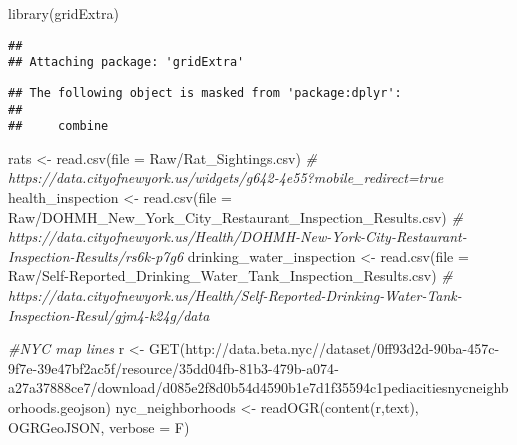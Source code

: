 \documentclass[
]{article}
\newenvironment{Shaded}{\begin{snugshade}}{\end{snugshade}}
\newcommand{\AttributeTok}[1]{\textcolor[rgb]{0.77,0.63,0.00}{#1}}
\newcommand{\CommentTok}[1]{\textcolor[rgb]{0.56,0.35,0.01}{\textit{#1}}}
\newcommand{\FunctionTok}[1]{\textcolor[rgb]{0.00,0.00,0.00}{#1}}
\newcommand{\NormalTok}[1]{#1}
\newcommand{\OtherTok}[1]{\textcolor[rgb]{0.56,0.35,0.01}{#1}}
\newcommand{\StringTok}[1]{\textcolor[rgb]{0.31,0.60,0.02}{#1}}
\begin{document}
\begin{Shaded}
\begin{Highlighting}[]
\FunctionTok{library}\NormalTok{(gridExtra)}
\end{Highlighting}
\end{Shaded}

\begin{verbatim}
## 
## Attaching package: 'gridExtra'
\end{verbatim}

\begin{verbatim}
## The following object is masked from 'package:dplyr':
## 
##     combine
\end{verbatim}

\begin{Shaded}
\begin{Highlighting}[]
\NormalTok{rats }\OtherTok{\textless{}{-}} \FunctionTok{read.csv}\NormalTok{(}\AttributeTok{file =} \StringTok{\textquotesingle{}Raw/Rat\_Sightings.csv\textquotesingle{}}\NormalTok{)}
\CommentTok{\# https://data.cityofnewyork.us/widgets/g642{-}4e55?mobile\_redirect=true}
\NormalTok{health\_inspection }\OtherTok{\textless{}{-}} \FunctionTok{read.csv}\NormalTok{(}\AttributeTok{file =} \StringTok{\textquotesingle{}Raw/DOHMH\_New\_York\_City\_Restaurant\_Inspection\_Results.csv\textquotesingle{}}\NormalTok{) }
\CommentTok{\# https://data.cityofnewyork.us/Health/DOHMH{-}New{-}York{-}City{-}Restaurant{-}Inspection{-}Results/rs6k{-}p7g6}
\NormalTok{drinking\_water\_inspection }\OtherTok{\textless{}{-}} \FunctionTok{read.csv}\NormalTok{(}\AttributeTok{file =} \StringTok{\textquotesingle{}Raw/Self{-}Reported\_Drinking\_Water\_Tank\_Inspection\_Results.csv\textquotesingle{}}\NormalTok{)}
\CommentTok{\# https://data.cityofnewyork.us/Health/Self{-}Reported{-}Drinking{-}Water{-}Tank{-}Inspection{-}Resul/gjm4{-}k24g/data }

\CommentTok{\#NYC map lines}
\NormalTok{r }\OtherTok{\textless{}{-}} \FunctionTok{GET}\NormalTok{(}\StringTok{\textquotesingle{}http://data.beta.nyc//dataset/0ff93d2d{-}90ba{-}457c{-}9f7e{-}39e47bf2ac5f/resource/35dd04fb{-}81b3{-}479b{-}a074{-}a27a37888ce7/download/d085e2f8d0b54d4590b1e7d1f35594c1pediacitiesnycneighborhoods.geojson\textquotesingle{}}\NormalTok{)}
\NormalTok{nyc\_neighborhoods }\OtherTok{\textless{}{-}} \FunctionTok{readOGR}\NormalTok{(}\FunctionTok{content}\NormalTok{(r,}\StringTok{\textquotesingle{}text\textquotesingle{}}\NormalTok{), }\StringTok{\textquotesingle{}OGRGeoJSON\textquotesingle{}}\NormalTok{, }\AttributeTok{verbose =}\NormalTok{ F)}
\end{Highlighting}
\end{Shaded}
\end{document}
